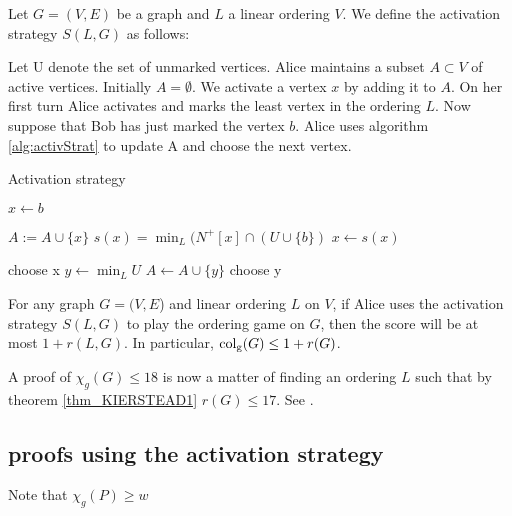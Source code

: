 \begin{definition} 
    Let $G=(V, E)$ be a graph and $L$ a linear ordering $V$. We define the activation strategy $S(L,G)$ as follows:
    
    Let U denote the set of unmarked vertices. Alice maintains a subset $A \subset V$ of active vertices. Initially $A = \emptyset$. We activate a vertex $x$ by adding it to $A$. On her first turn Alice activates and marks the least vertex in the ordering $L$. Now suppose that Bob has just marked the vertex $b$. Alice uses algorithm \ref{alg:activStrat} to update A and choose the
    next vertex.
    \begin{algorithm}[h]
        \caption{Activation strategy}
        \label{alg:activStrat}
        \begin{algorithmic}[1]
            \Statex
            \State $x \gets b$ 
            
                \State $A := A \cup \{x\}$
                \State $s(x) =\min_L(N^+[x] \cap (U \cup \{b\} )$
                \State $x \gets s(x)$
            \EndWhile      
            
                \State choose x
            \Else
                \State $y \gets \min_L U$
                    \State $A \gets A \cup \{y\}$                    
                \EndIf     
                \State choose y
            \EndIf   
        \end{algorithmic}
    \end{algorithm}
    
\end{definition}


\begin{theorem} \label{thm_KIERSTEAD1}
    For any graph $G=(V, E$) and linear ordering $L$ on $V$, if Alice uses the activation strategy $S(L, G)$ to play the ordering game on $G$, then the score will be at most $1+r(L, G)$. In particular, $\operatorname{col_g}(G) \leq 1+r(G)$.
\end{theorem}

A proof of $\chi_g(G) \leq 18$ is now a matter of finding an ordering $L$ such that by theorem \ref{thm_KIERSTEAD1} $r(G) \leq 17$. See \cite{KIERSTEAD2000}.


\subsection{proofs using the activation strategy}
Note that $\chi_g(P) \geq w$

